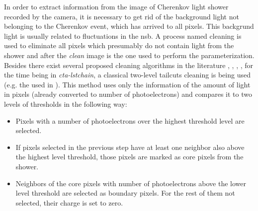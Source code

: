 \documentclass[main.tex]{subfiles}
\begin{document}
In order to extract information from the image of Cherenkov light shower recorded by the camera, it is necessary to get rid of the background light not belonging to the Cherenkov event, which has arrived to all pixels. This backgrund light is usually related to fluctuations in the \gls{nsb}. A process named cleaning is used to eliminate all pixels which presumably do not contain light from the shower and after the \textit{clean} image is the one used to perform the parameterization. Besides there exist several proposed cleaning algorithms in the literature \cite{2019cleaningCNN}, \cite{2013neighborcleaning}, \cite{2005Cleaningwithtimeinfo}, \cite{2001waveletcleaning}, for the time being in \textit{cta-lstchain}, a classical two-level tailcuts cleaning is being used (e.g. the used in \cite{1997HEGRAperformance}). This method uses only the information of the amount of light in pixels (already converted to number of photoelectrons) and compares it to two levels of thresholds in the following way:

\begin{itemize}

\item Pixels with a number of photoelectrons over the highest threshold level are selected.
\item If pixels selected in the previous step have at least one neighbor also above the highest level threshold, those pixels are marked as core pixels from the shower.

 \item Neighbors of the core pixels with number of photoelectrons above the lower level threshold are selected as boundary pixels. For the rest of them not selected, their charge is set to zero. 
\end{itemize}
   
\end{document}
